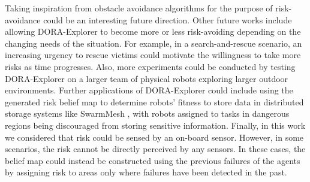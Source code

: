 Taking inspiration from obstacle avoidance algorithms for the purpose of risk-avoidance could be an interesting future direction. Other future works include allowing DORA-Explorer to become more
or less risk-avoiding depending on the changing needs of the
situation. For example, in a search-and-rescue scenario, an increasing
urgency to rescue victims could motivate the willingness to take more
risks as time progresses. Also, more experiments could be conducted by
testing DORA-Explorer on a larger team of physical robots exploring
larger outdoor environments. Further applications of DORA-Explorer could
include using the generated risk belief map to determine robots'
fitness to store data in distributed storage systems like SwarmMesh
\cite{majcherczykSwarmmesh2020}, with robots assigned to tasks in
dangerous regions being discouraged from storing sensitive
information. Finally, in this work we considered that risk could be sensed by an on-board sensor. However,
in some scenarios, the risk cannot be directly perceived by any
sensors. In these cases, the belief map could instead be constructed using the
previous failures of the agents by assigning risk to areas only where
failures have been detected in the past.
